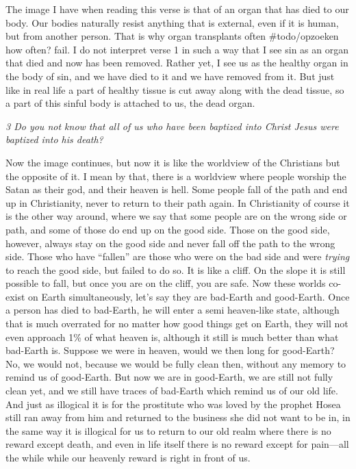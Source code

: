 The image I have when reading this verse is that of an organ that has
died to our body. Our bodies naturally resist anything that is external,
even if it is human, but from another person. That is why organ
transplants often \#todo/opzoeken how often? fail. I do not interpret
verse 1 in such a way that I see sin as an organ that died and now has
been removed. Rather yet, I see us as the healthy organ in the body of
sin, and we have died to it and we have removed from it. But just like
in real life a part of healthy tissue is cut away along with the dead
tissue, so a part of this sinful body is attached to us, the dead organ.

\emph{3 Do you not know that all of us who have been baptized into
Christ Jesus were baptized into his death?}

Now the image continues, but now it is like the worldview of the
Christians but the opposite of it. I mean by that, there is a worldview
where people worship the Satan as their god, and their heaven is hell.
Some people fall of the path and end up in Christianity, never to return
to their path again. In Christianity of course it is the other way
around, where we say that some people are on the wrong side or path, and
some of those do end up on the good side. Those on the good side,
however, always stay on the good side and never fall off the path to the
wrong side. Those who have ``fallen'' are those who were on the bad side
and were \emph{trying} to reach the good side, but failed to do so. It
is like a cliff. On the slope it is still possible to fall, but once you
are on the cliff, you are safe. Now these worlds co-exist on Earth
simultaneously, let's say they are bad-Earth and good-Earth. Once a
person has died to bad-Earth, he will enter a semi heaven-like state,
although that is much overrated for no matter how good things get on
Earth, they will not even approach 1\% of what heaven is, although it
still is much better than what bad-Earth is. Suppose we were in heaven,
would we then long for good-Earth? No, we would not, because we would be
fully clean then, without any memory to remind us of good-Earth. But now
we are in good-Earth, we are still not fully clean yet, and we still
have traces of bad-Earth which remind us of our old life. And just as
illogical it is for the prostitute who was loved by the prophet Hosea
still ran away from him and returned to the business she did not want to
be in, in the same way it is illogical for us to return to our old realm
where there is no reward except death, and even in life itself there is
no reward except for pain---all the while while our heavenly reward is
right in front of us.

